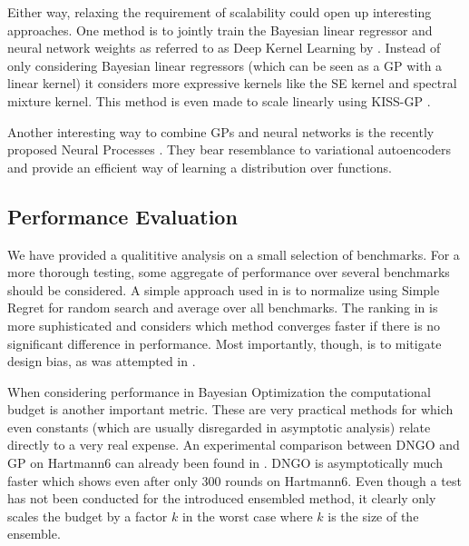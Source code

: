 \documentclass[conference,compsoc]{IEEEtran}
\theoremstyle{definition}
\begin{document}
        Either way, relaxing the requirement of scalability could open up interesting approaches.
        One method is to jointly train the Bayesian linear regressor and neural network weights as referred to as Deep Kernel Learning by \parencite{wilson_deep_2016}.
        Instead of only considering Bayesian linear regressors (which can be seen as a GP with a linear kernel) it considers more expressive kernels like the SE kernel and spectral mixture kernel.
        This method is even made to scale linearly using KISS-GP \parencite{wilson_kernel_2015}.

        Another interesting way to combine GPs and neural networks is the recently proposed Neural Processes \parencite{garnelo_neural_2018}.
        They bear resemblance to variational autoencoders and provide an efficient way of learning a distribution over functions.
    
    \subsection{Performance Evaluation}\label{sec:disc-evaluation}
        
        We have provided a qualititive analysis on a small selection of benchmarks.
        For a more thorough testing, some aggregate of performance over several benchmarks should be considered.
        A simple approach used in \parencite{golovin_google_2017} is to normalize using Simple Regret for random search and average over all benchmarks.
        The ranking in \parencite{dewancker_stratified_2016} is more suphisticated and considers which method converges faster if there is no significant difference in performance.
        Most importantly, though, is to mitigate design bias, as was attempted in \parencite{dewancker_stratified_2016}.

        When considering performance in Bayesian Optimization the computational budget is another important metric.
        These are very practical methods for which even constants (which are usually disregarded in asymptotic analysis) relate directly to a very real expense.
        An experimental comparison between DNGO and GP on Hartmann6 can already been found in \parencite{snoek_scalable_2015}.
        DNGO is asymptotically much faster which shows even after only 300 rounds on Hartmann6.
        Even though a test has not been conducted for the introduced ensembled method, it clearly only scales the budget by a factor $k$ in the worst case where $k$ is the size of the ensemble.
\end{document}
